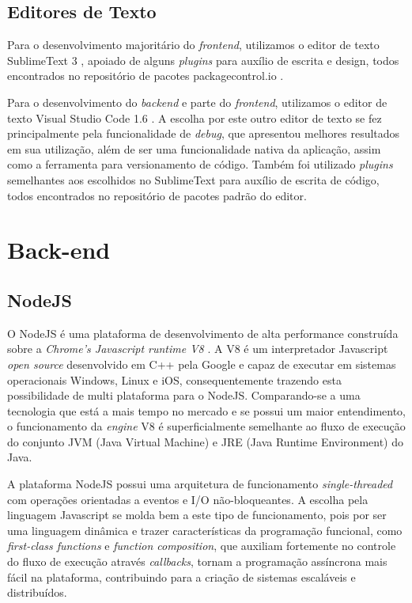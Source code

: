 \subsection{Editores de Texto}
Para o desenvolvimento majoritário do \textit{frontend}, utilizamos o editor de texto SublimeText 3 \cite{sublime}, apoiado de alguns \textit{plugins} para auxílio de escrita e design, todos encontrados no repositório de pacotes packagecontrol.io \cite{packagecontrolio}.

Para o desenvolvimento do \textit{backend} e parte do \textit{frontend}, utilizamos o editor de texto Visual Studio Code 1.6 \cite{vscode}. A escolha por este outro editor de texto se fez principalmente pela funcionalidade de \textit{debug}, que apresentou melhores resultados em sua utilização, além de ser uma funcionalidade nativa da aplicação, assim como a ferramenta para versionamento de código. Também foi utilizado \textit{plugins} semelhantes aos escolhidos no SublimeText para auxílio de escrita de código, todos encontrados no repositório de pacotes padrão do editor.

\section{Back-end}
\subsection{NodeJS}
O NodeJS \cite{nodejs} é uma plataforma de desenvolvimento de alta performance construída sobre a \textit{Chrome's Javascript runtime V8} \cite{v8}. A V8 é um interpretador Javascript \textit{open source} desenvolvido em C++ pela Google e capaz de executar em sistemas operacionais Windows, Linux e iOS, consequentemente trazendo esta possibilidade de multi plataforma para o NodeJS. Comparando-se a uma tecnologia que está a mais tempo no mercado e se possui um maior entendimento, o funcionamento da \textit{engine} V8 é superficialmente semelhante ao fluxo de execução do conjunto JVM (Java Virtual Machine) e JRE (Java Runtime Environment) do Java.

A plataforma NodeJS possui uma arquitetura de funcionamento \textit{single-threaded} com operações orientadas a eventos e I/O não-bloqueantes. A escolha pela linguagem Javascript se molda bem a este tipo de funcionamento, pois por ser uma linguagem dinâmica e trazer características da programação funcional, como \textit{first-class functions} e \textit{function composition}, que auxiliam fortemente no controle do fluxo de execução através \textit{callbacks}, tornam a programação assíncrona mais fácil na plataforma, contribuindo para a criação de sistemas escaláveis e distribuídos.

